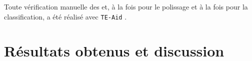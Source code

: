 \documentclass[10pt]{article}
\begin{document}
\bigskip

Toute vérification manuelle des \acrshort{et}, à la fois pour le polissage et à la fois pour la classification, a été réalisé avec \texttt{TE-Aid} \cite{goubert_beginners_2022}.


\newpage




\newpage\clearpage

\section{Résultats obtenus et discussion}
\end{document}
